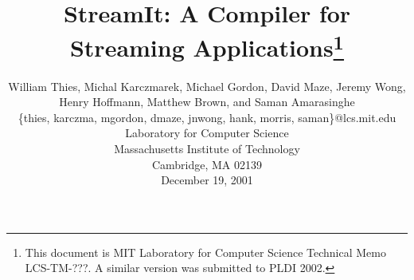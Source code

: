 \documentclass{sig-alternate}
\begin{document}

\title{StreamIt: A Compiler for Streaming Applications\thanks{This document is MIT Laboratory for Computer Science Technical Memo LCS-TM-???.  A similar version was submitted to PLDI 2002.}}


\author{
\alignauthor \vspace{-18pt}
William Thies, 
Michal Karczmarek, 
Michael Gordon, 
David Maze, 
Jeremy Wong,
Henry Hoffmann, 
Matthew Brown, 
and Saman Amarasinghe\\
	\vspace{8pt}
	\{thies, karczma, mgordon, dmaze, jnwong, hank, morris, saman\}@lcs.mit.edu \\
	\vspace{8pt}
	Laboratory for Computer Science \\
	Massachusetts Institute of Technology \\
	Cambridge, MA  02139 \\
	\vspace{8pt}
        December 19, 2001}
	

\newcommand{\ma}[2]{max_{#1 \rightarrow #2}}
\newcommand{\sdep}[0]{\textsc{sdep}}
\newcommand{\loopdep}[0]{\textsc{loopdep}}
\newcommand{\mi}[2]{\sdep_{#2 \small{\rightarrow} #1}}
\newcommand{\floor}[2]{\left\lfloor\frac{#1}{#2}\right\rfloor}
\newcommand{\ceil}[2]{\left\lceil\frac{#1}{#2}\right\rceil}
\newcommand{\ra}[0]{\rightarrow}
\newcommand{\la}[0]{\lambda}

\def\fn#1{\mathop{\mbox{\it #1}}}
\def\fun#1#2{\ensuremath{\mathop{\mbox{\it #1}}(#2)}} %

\newtheorem{definition}{Definition}
\newtheorem{theorem}{Theorem}

\maketitle

\begin{abstract}

\end{abstract}











\end{document}

